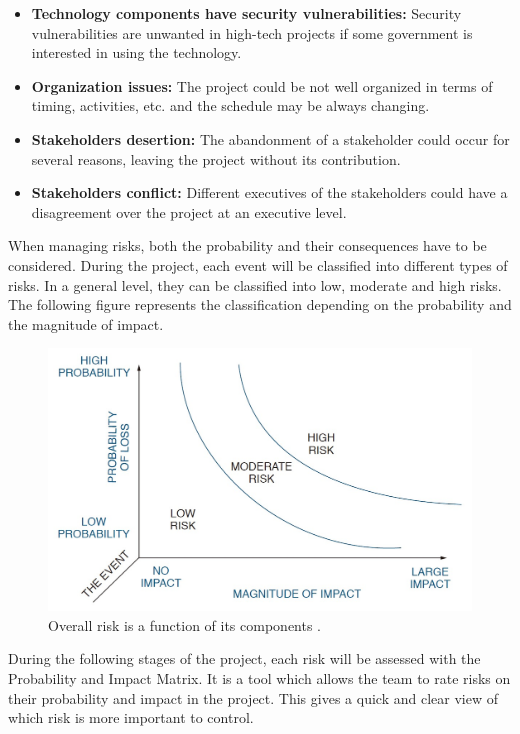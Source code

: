\begin{itemize}
	\item \textbf{Technology components have security vulnerabilities:} Security vulnerabilities are unwanted in high-tech projects if some government is interested in using the technology.
	
	\item \textbf{Organization issues:} The project could be not well organized in terms of timing, activities, etc. and the schedule may be always changing.
	
	\item \textbf{Stakeholders desertion:} The abandonment of a stakeholder could occur for several reasons, leaving the project without its contribution.
	
	\item \textbf{Stakeholders conflict:} Different executives of the stakeholders could have a disagreement over the project at an executive level.
	
	
\end{itemize}

When managing risks, both the probability and their consequences have to be considered. During the project, each event will be classified into different types of risks. In a general level, they can be classified into low, moderate and high risks. The following figure represents the classification depending on the probability and the magnitude of impact.

\begin{figure}[H]
	\centering
	\includegraphics[width=0.65\linewidth]{./images/risks1}
	\caption[Overall risk is a function of its components]{Overall risk is a function of its components \cite{Kerzner2009}.}
	\label{fig:risks1}
\end{figure}

During the following stages of the project, each risk will be assessed with the Probability and Impact Matrix. It is a tool which allows the team to rate risks on their probability and impact in the project. This gives a quick and clear view of which risk is more important to control.

